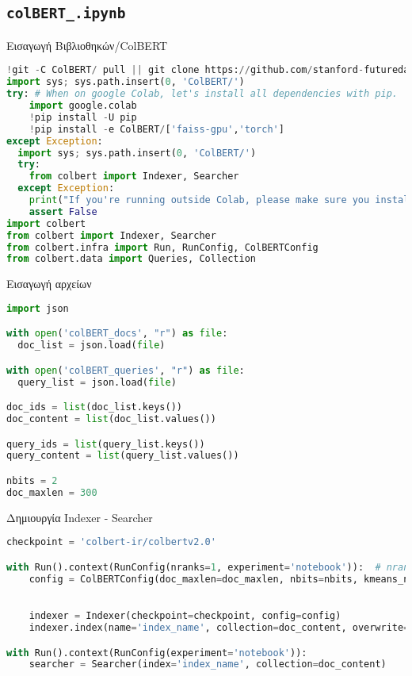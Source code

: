 \subsection{\texttt{colBERT\_.ipynb}}
\noindent Εισαγωγή Βιβλιοθηκών/ColBERT
\begin{lstlisting}[language=Python]
!git -C ColBERT/ pull || git clone https://github.com/stanford-futuredata/ColBERT.git
import sys; sys.path.insert(0, 'ColBERT/')
try: # When on google Colab, let's install all dependencies with pip.
    import google.colab
    !pip install -U pip
    !pip install -e ColBERT/['faiss-gpu','torch']
except Exception:
  import sys; sys.path.insert(0, 'ColBERT/')
  try:
    from colbert import Indexer, Searcher
  except Exception:
    print("If you're running outside Colab, please make sure you install ColBERT in conda following the instructions in our README. You can also install (as above) with pip but it may install slower or less stable faiss or torch dependencies. Conda is recommended.")
    assert False
import colbert
from colbert import Indexer, Searcher
from colbert.infra import Run, RunConfig, ColBERTConfig
from colbert.data import Queries, Collection
\end{lstlisting}
Εισαγωγή αρχείων
\begin{lstlisting}[language=Python]
import json

with open('colBERT_docs', "r") as file:
  doc_list = json.load(file)

with open('colBERT_queries', "r") as file:
  query_list = json.load(file)

doc_ids = list(doc_list.keys())
doc_content = list(doc_list.values())

query_ids = list(query_list.keys())
query_content = list(query_list.values())

nbits = 2
doc_maxlen = 300
\end{lstlisting}
Δημιουργία Indexer - Searcher
\begin{lstlisting}[language=Python]
checkpoint = 'colbert-ir/colbertv2.0'

with Run().context(RunConfig(nranks=1, experiment='notebook')):  # nranks specifies the number of GPUs to use
    config = ColBERTConfig(doc_maxlen=doc_maxlen, nbits=nbits, kmeans_niters=20) # kmeans_niters specifies the number of iterations of k-means clustering; 4 is a good and fast default.
                                                                                # Consider larger numbers for small datasets.

    indexer = Indexer(checkpoint=checkpoint, config=config)
    indexer.index(name='index_name', collection=doc_content, overwrite=True)

with Run().context(RunConfig(experiment='notebook')):
    searcher = Searcher(index='index_name', collection=doc_content)
\end{lstlisting}

